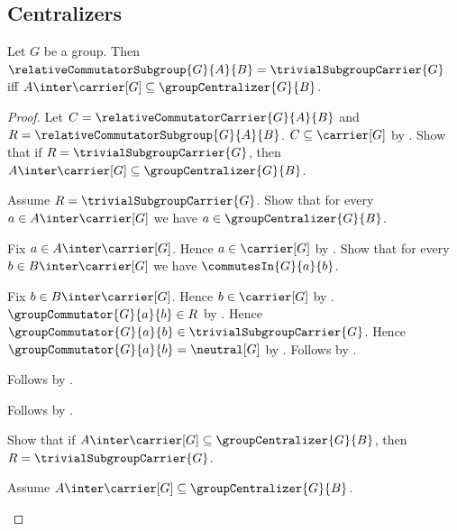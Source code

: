 \subsection{Centralizers}

\begin{theorem}\label{relative_commutator_trivial_iff_trace_subset_centralizer}
    Let $G$ be a group.
    Then
        $\relativeCommutatorSubgroup{G}{A}{B}=
            \trivialSubgroupCarrier{G}$ iff
        $A\inter\carrier[G]\subseteq\groupCentralizer{G}{B}$.
\end{theorem}
\begin{proof}
    Let $C=\relativeCommutatorCarrier{G}{A}{B}$ and
        $R=\relativeCommutatorSubgroup{G}{A}{B}$.
    $C\subseteq\carrier[G]$ by
        .
    Show that if $R=\trivialSubgroupCarrier{G}$, then
        $A\inter\carrier[G]\subseteq\groupCentralizer{G}{B}$.
    \begin{subproof}
        Assume $R=\trivialSubgroupCarrier{G}$.
        Show that for every $a\in A\inter\carrier[G]$ we have
            $a\in\groupCentralizer{G}{B}$.
        \begin{subproof}
            Fix $a\in A\inter\carrier[G]$.
            Hence $a\in\carrier[G]$ by .
            Show that for every $b\in B\inter\carrier[G]$ we have
                $\commutesIn{G}{a}{b}$.
            \begin{subproof}
                Fix $b\in B\inter\carrier[G]$.
                Hence $b\in\carrier[G]$ by .
                $\groupCommutator{G}{a}{b}\in R$ by
                    .
                Hence
                    $\groupCommutator{G}{a}{b}\in
                        \trivialSubgroupCarrier{G}$.
                Hence $\groupCommutator{G}{a}{b}=\neutral[G]$ by
                    .
                Follows by
                    .
            \end{subproof}
            Follows by .
        \end{subproof}
        Follows by .
    \end{subproof}
    Show that if
        $A\inter\carrier[G]\subseteq\groupCentralizer{G}{B}$, then
        $R=\trivialSubgroupCarrier{G}$.
    \begin{subproof}
        Assume
            $A\inter\carrier[G]\subseteq\groupCentralizer{G}{B}$.

\end{subproof}
\end{proof}
